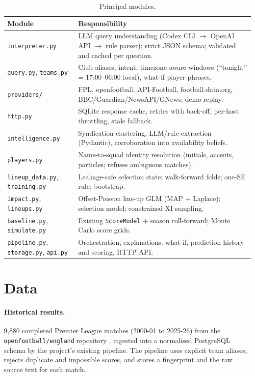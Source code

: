 \documentclass[11pt,a4paper]{article}
\newcommand{\code}[1]{\texttt{\small #1}}
\begin{document}
\begin{table}[h]
\centering\small
\begin{tabularx}{\linewidth}{@{}lX@{}}
\toprule
Module & Responsibility \\
\midrule
\code{interpreter.py} & LLM query understanding (Codex CLI $\to$ OpenAI API $\to$ rule parser); strict JSON schema; validated and cached per question. \\
\code{query.py}, \code{teams.py} & Club aliases, intent, timezone-aware windows (``tonight'' = 17:00--06:00 local), what-if player phrases. \\
\code{providers/} & FPL, openfootball, API-Football, football-data.org, BBC/Guardian/NewsAPI/GNews; demo replay. \\
\code{http.py} & SQLite response cache, retries with back-off, per-host throttling, stale fallback. \\
\code{intelligence.py} & Syndication clustering, LLM/rule extraction (Pydantic), corroboration into availability beliefs. \\
\code{players.py} & Name-to-squad identity resolution (initials, accents, particles; refuses ambiguous matches). \\
\code{lineup\_data.py}, \code{training.py} & Leakage-safe selection state; walk-forward folds; one-SE rule; bootstrap. \\
\code{impact.py}, \code{lineups.py} & Offset-Poisson line-up GLM (MAP + Laplace); selection model; constrained XI sampling. \\
\code{baseline.py}, \code{simulate.py} & Existing \code{ScoreModel} + season roll-forward; Monte Carlo score grids. \\
\code{pipeline.py}, \code{storage.py}, \code{api.py} & Orchestration, explanations, what-if, prediction history and scoring, HTTP API. \\
\bottomrule
\end{tabularx}
\caption{Principal modules.}
\label{tab:modules}
\end{table}

\section{Data}\label{sec:data}

\paragraph{Historical results.}
9{,}880 completed Premier League matches (2000-01 to 2025-26) from
the \code{openfootball/}\allowbreak\code{england} repository \citep{openfootball}, ingested into a normalised
PostgreSQL schema by the project's existing pipeline. The pipeline uses
explicit team aliases, rejects duplicate and impossible scores, and stores a
fingerprint and the raw source text for each match.
\end{document}
